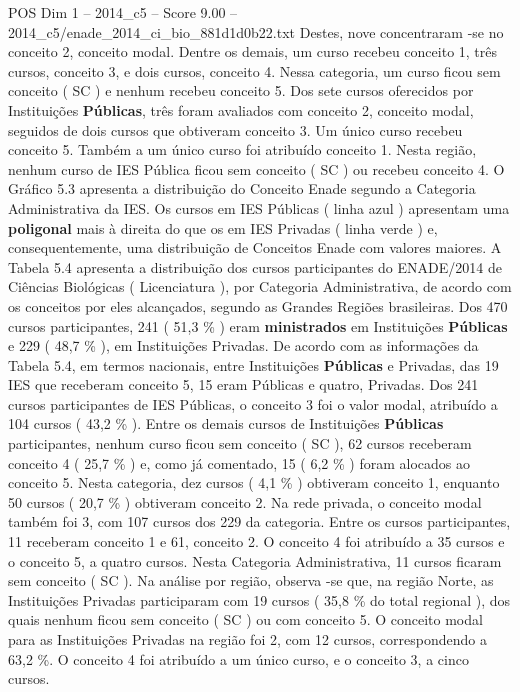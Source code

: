 \begin{textsample}{POS Dim 1 – 2014\_c5 – Score 9.00 – 2014\_c5/enade\_2014\_ci\_bio\_881d1d0b22.txt}
Destes, nove concentraram -se no conceito 2, conceito modal.
Dentre os demais, um curso recebeu conceito 1, três cursos, conceito 3, e dois cursos, conceito 4.
Nessa categoria, um curso ficou sem conceito ( SC ) e nenhum recebeu conceito 5.
Dos sete cursos oferecidos por Instituições \textbf{Públicas}, três foram avaliados com conceito 2, conceito modal, seguidos de dois cursos que obtiveram conceito 3.
Um único curso recebeu conceito 5.
Também a um único curso foi atribuído conceito 1.
Nesta região, nenhum curso de IES Pública ficou sem conceito ( SC ) ou recebeu conceito 4.
O Gráfico 5.3 apresenta a distribuição do Conceito Enade segundo a Categoria Administrativa da IES.
Os cursos em IES Públicas ( linha azul ) apresentam uma \textbf{poligonal} mais à direita do que os em IES Privadas ( linha verde ) e, consequentemente, uma distribuição de Conceitos Enade com valores maiores.
A Tabela 5.4 apresenta a distribuição dos cursos participantes do ENADE/2014 de Ciências Biológicas ( Licenciatura ), por Categoria Administrativa, de acordo com os conceitos por eles alcançados, segundo as Grandes Regiões brasileiras.
Dos 470 cursos participantes, 241 ( 51,3 \% ) eram \textbf{ministrados} em Instituições \textbf{Públicas} e 229 ( 48,7 \% ), em Instituições Privadas.
De acordo com as informações da Tabela 5.4, em termos nacionais, entre Instituições \textbf{Públicas} e Privadas, das 19 IES que receberam conceito 5, 15 eram Públicas e quatro, Privadas.
Dos 241 cursos participantes de IES Públicas, o conceito 3 foi o valor modal, atribuído a 104 cursos ( 43,2 \% ).
Entre os demais cursos de Instituições \textbf{Públicas} participantes, nenhum curso ficou sem conceito ( SC ), 62 cursos receberam conceito 4 ( 25,7 \% ) e, como já comentado, 15 ( 6,2 \% ) foram alocados ao conceito 5.
Nesta categoria, dez cursos ( 4,1 \% ) obtiveram conceito 1, enquanto 50 cursos ( 20,7 \% ) obtiveram conceito 2.
Na rede privada, o conceito modal também foi 3, com 107 cursos dos 229 da categoria.
Entre os cursos participantes, 11 receberam conceito 1 e 61, conceito 2.
O conceito 4 foi atribuído a 35 cursos e o conceito 5, a quatro cursos.
Nesta Categoria Administrativa, 11 cursos ficaram sem conceito ( SC ).
Na análise por região, observa -se que, na região Norte, as Instituições Privadas participaram com 19 cursos ( 35,8 \% do total regional ), dos quais nenhum ficou sem conceito ( SC ) ou com conceito 5.
O conceito modal para as Instituições Privadas na região foi 2, com 12 cursos, correspondendo a 63,2 \%.
O conceito 4 foi atribuído a um único curso, e o conceito 3, a cinco cursos.

\end{textsample}

